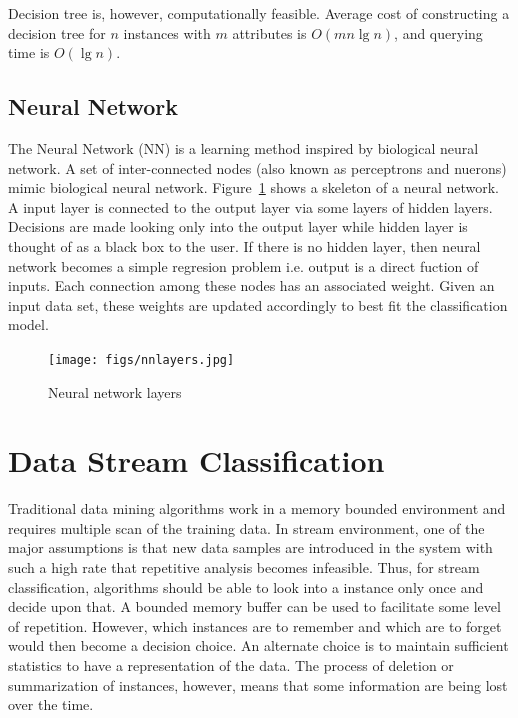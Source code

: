 \documentclass[a4paper, 11pt, oneside]{book}
\begin{document}
Decision tree is, however, computationally feasible. Average cost of constructing a decision tree for $n$ instances with $m$ attributes is $O(mn \lg n)$, and querying time is $O(\lg n)$.

\subsection{Neural Network}
The Neural Network (NN) is a learning method inspired by biological neural network. A set of inter-connected nodes (also known as perceptrons and nuerons) mimic biological neural network. Figure~\ref{fig:bg:nnlayer} shows a skeleton of a neural network. A input layer is connected to the output layer via some layers of hidden layers. Decisions are made looking only into the output layer while hidden layer is thought of as a black box to the user. If there is no hidden layer, then neural network becomes a simple regresion problem i.e. output is a direct fuction of inputs. Each connection among these nodes has an associated weight. Given an input data set, these weights are updated accordingly to best fit the classification model. 
\begin{figure}[htbp]
    \begin{center}
        \texttt{[image: figs/nnlayers.jpg]}
        \caption{Neural network layers}
        \label{fig:bg:nnlayer}
    \end{center}
\end{figure}

% 

\section{Data Stream Classification}
Traditional data mining algorithms work in a memory bounded environment and requires multiple scan of the training data. In stream environment, one of the major assumptions is that new data samples are introduced in the system with such a high rate that repetitive analysis becomes infeasible. Thus, for stream classification, algorithms should be able to look into a instance only once and decide upon that. A bounded memory buffer can be used to facilitate some level of repetition. However, which instances are to remember and which are to forget would then become a decision choice. An alternate choice is to maintain sufficient statistics to have a representation of the data. The process of deletion or summarization of instances, however, means that some information are being lost over the time.
\end{document}
